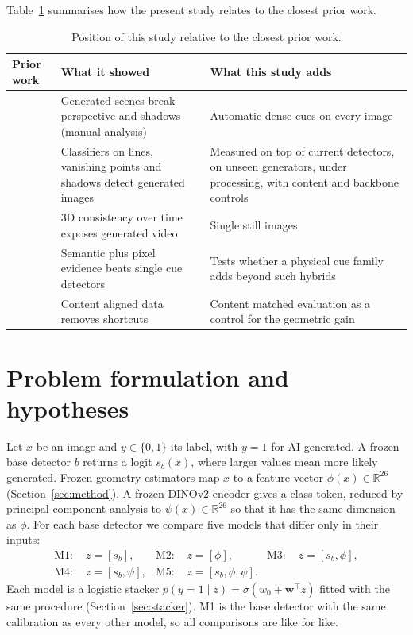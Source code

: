 \documentclass[11pt,a4paper]{article}
\begin{document}
Table~\ref{tab:position} summarises how the present study relates to the closest prior work.

\begin{table}[t]
\centering
\caption{Position of this study relative to the closest prior work.}
\label{tab:position}
\small
\begin{tabularx}{\linewidth}{@{}p{3.6cm}X X@{}}
\toprule
Prior work & What it showed & What this study adds \\
\midrule
\citet{farid2022perspective,farid2022lighting} & Generated scenes break perspective and shadows (manual analysis) & Automatic dense cues on every image \\
\citet{sarkar2024shadows} & Classifiers on lines, vanishing points and shadows detect generated images & Measured on top of current detectors, on unseen generators, under processing, with content and backbone controls \\
\citet{chen2025grab3d} & 3D consistency over time exposes generated video & Single still images \\
\citet{cheng2025cospy,yan2025aide} & Semantic plus pixel evidence beats single cue detectors & Tests whether a physical cue family adds beyond such hybrids \\
\citet{guillaro2025bfree,rajan2025alignment} & Content aligned data removes shortcuts & Content matched evaluation as a control for the geometric gain \\
\bottomrule
\end{tabularx}
\end{table}

\section{Problem formulation and hypotheses}
\label{sec:problem}

Let $x$ be an image and $y \in \{0,1\}$ its label, with $y=1$ for AI generated. A frozen base detector $b$ returns a logit $s_b(x)$, where larger values mean more likely generated. Frozen geometry estimators map $x$ to a feature vector $\phi(x) \in \mathbb{R}^{26}$ (Section~\ref{sec:method}). A frozen DINOv2 encoder gives a class token, reduced by principal component analysis to $\psi(x) \in \mathbb{R}^{26}$ so that it has the same dimension as $\phi$. For each base detector we compare five models that differ only in their inputs:
\begin{align}
\text{M1: } & z = [s_b], & \text{M2: } & z = [\phi], & \text{M3: } & z = [s_b, \phi], \nonumber\\
\text{M4: } & z = [s_b, \psi], & \text{M5: } & z = [s_b, \phi, \psi]. \label{eq:models}
\end{align}
Each model is a logistic stacker $p(y=1 \mid z) = \sigma(w_0 + \mathbf{w}^\top z)$ fitted with the same procedure (Section~\ref{sec:stacker}). M1 is the base detector with the same calibration as every other model, so all comparisons are like for like.
\end{document}
